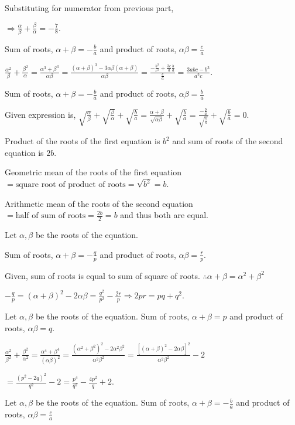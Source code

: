     Substituting for numerator from previous part,

    $\Rightarrow \frac{\alpha}{\beta} + \frac{\beta}{\alpha} = -\frac{7}{8}$.
  \stopitemize
\item Sum of roots, $\alpha + \beta = -\frac{b}{a}$ and product of roots, $\alpha\beta = \frac{c}{a}$

  $\frac{\alpha^2}{\beta} + \frac{\beta^2}{\alpha} = \frac{\alpha^3 + \beta^3}{\alpha\beta} =
  \frac{(\alpha + \beta)^3 - 3\alpha\beta(\alpha + \beta)}{\alpha\beta} = \frac{-\frac{b^3}{c^3} +
    \frac{3c}{a}\frac{b}{a}}{\frac{c}{a}} = \frac{3abc - b^3}{a^2c}$.
\item Sum of roots, $\alpha + \beta = -\frac{b}{a}$ and product of roots, $\alpha\beta = \frac{b}{a}$

  Given expression is, $\sqrt{\frac{\alpha}{\beta}} + \sqrt{\frac{\beta}{\alpha}} + \sqrt{\frac{b}{a}} =
  \frac{\alpha + \beta}{\sqrt{\alpha\beta}} + \sqrt{\frac{b}{a}} =
  \frac{-\frac{b}{a}}{\sqrt{\frac{b}{a}}} + \sqrt{\frac{b}{a}} = 0$.
\item Product of the roots of the first equation is $ b^2$ and sum of roots of the second equation is $2b$.

  Geometric mean of the roots of the first equation $= \text{square root of product of roots} = \sqrt{b^2} =
  b$.

  Arithmetic mean of the roots of the second equation $= \text{half of sum of roots} = \frac{2b}{2} = b$ and
  thus both are equal.
\item Let $\alpha, \beta$ be the roots of the equation.

  Sum of roots, $\alpha + \beta = -\frac{q}{p}$ and product of roots, $\alpha\beta = \frac{r}{p}$.

  Given, sum of roots is equal to sum of square of roots. $\therefore \alpha + \beta = \alpha^2 + \beta^2$

  $-\frac{q}{p} = (\alpha + \beta)^2 - 2\alpha\beta = \frac{q^2}{p^2} - \frac{2r}{p}\Rightarrow 2pr = pq +
  q^2$.
\item Let $\alpha, \beta$ be the roots of the equation. Sum of roots, $\alpha + \beta = p$ and product of
  roots, $\alpha\beta = q$.

  $\frac{\alpha^2}{\beta^2} + \frac{\beta^2}{\alpha^2} = \frac{\alpha^4 + \beta^4}{(\alpha\beta)^2} =
  \frac{(\alpha^2 + \beta^2)^2 - 2\alpha^2\beta^2}{\alpha^2\beta^2} = \frac{[(\alpha + \beta)^2 -
      2\alpha\beta]^2}{\alpha^2\beta^2} - 2$

  $= \frac{(p^2 - 2q)^2}{q^2} - 2 = \frac{p^4}{q^2} - \frac{4p^2}{q} + 2$.
\item Let $\alpha, \beta$ be the roots of the equation. Sum of roots, $\alpha + \beta = -\frac{b}{a}$ and
  product of roots, $\alpha\beta = \frac{c}{a}$

